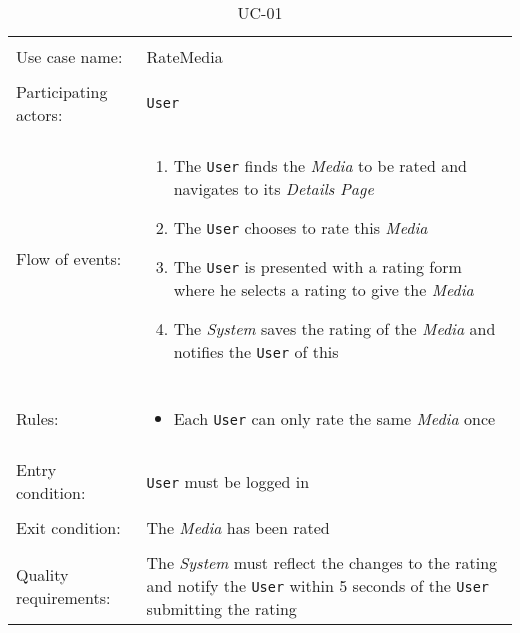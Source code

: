 \documentclass[../report.tex]{subfiles}
\begin{document}

\captionsetup[table]{labelformat=empty}
\captionsetup[table]{font=large}
\captionsetup[table]{textfont=bf}

\noindent
\begin{table}
\caption{UC-01}
\label{UC-01}
\begin{tabular}{ l  p{8cm} }  
\hline
\\
Use case name:  & RateMedia   \\   \hline    
\\            
Participating actors:  & \texttt{\texttt{User}} \\   \hline   
\\             
Flow of events: & \begin{enumerate}
\item{The \texttt{User} finds the \textit{Media} to be rated and navigates to its \textit{Details Page}}
\item{The \texttt{User} chooses to rate this \textit{Media}}
\item{The \texttt{User} is presented with a rating form where he selects a rating to give the \textit{Media}}
\item{The \textit{System} saves the rating of the \textit{Media} and notifies the \texttt{User} of this}
\end{enumerate}
\\ \hline
\\
Rules: & \begin{itemize}
\item{Each \texttt{User} can only rate the same \textit{Media} once}
\end{itemize} 
\\   \hline 
\\
Entry condition: & \texttt{User} must be logged in \\ \hline
\\
Exit condition: & The \textit{Media} has been rated \\ \hline
\\
Quality requirements: & The \textit{System} must reflect the changes to the rating and notify the \texttt{User} within 5 seconds of the
\texttt{User} submitting the rating\\ \hline  
\end{tabular}
\end{table}
\end{document}
